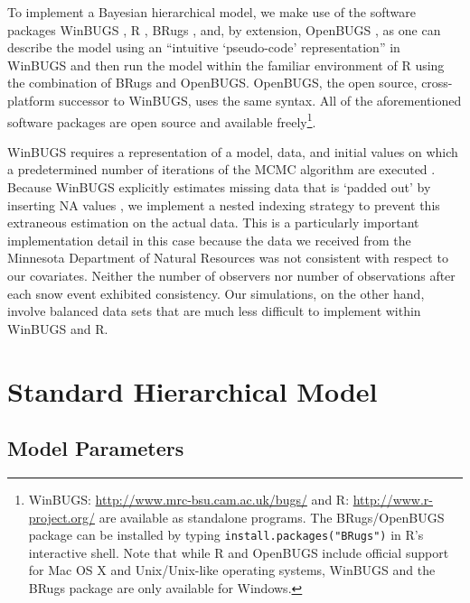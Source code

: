 \documentclass[12pt]{article}
\begin{document}
    To implement a Bayesian hierarchical model, we make use of the software
    packages WinBUGS \cite{Lunn2000}, R \cite{R2009}, BRugs \cite{Thomas2008},
    and, by extension, OpenBUGS \cite{Thomas2006}, as one can describe the model
    using an ``intuitive `pseudo-code' representation'' in WinBUGS
    \cite{MacKenzie2006} and then run the model within the familiar environment
    of R using the combination of BRugs and OpenBUGS. OpenBUGS, the open source,
    cross-platform successor to WinBUGS, uses the same syntax. All of the
    aforementioned software packages are open source and available
    freely\footnote{WinBUGS: \url{http://www.mrc-bsu.cam.ac.uk/bugs/} and R:
    \url{http://www.r-project.org/} are available as standalone programs. The
    BRugs/OpenBUGS package can be installed by typing
    \texttt{install.packages("BRugs")} in R's interactive shell. Note that while
    R and OpenBUGS include official support for Mac OS X and Unix/Unix-like
    operating systems, WinBUGS and the BRugs package are only available for
    Windows.}.

    WinBUGS requires a representation of a model, data, and initial values on
    which a predetermined number of iterations of the MCMC algorithm are
    executed \cite{MacKenzie2006}. Because WinBUGS explicitly estimates missing
    data that is `padded out' by inserting NA values \cite{Spiegelhalter2003},
    we implement a nested indexing strategy to prevent this extraneous
    estimation on the actual data. This is a particularly important
    implementation detail in this case because the data we received from the
    Minnesota Department of Natural Resources was not consistent with respect to
    our covariates. Neither the number of observers nor number of observations
    after each snow event exhibited consistency. Our simulations, on the other
    hand, involve balanced data sets that are much less difficult to implement
    within WinBUGS and R.


\section{Standard Hierarchical Model}

    \subsection{Model Parameters}
\end{document}
